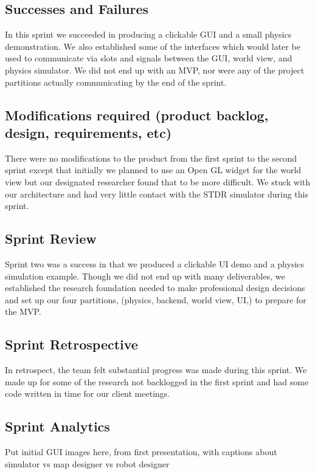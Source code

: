 \subsection{Successes and Failures}

In this sprint we succeeded in producing a clickable GUI and a small physics demonstration. We also established some of the interfaces which would later be used to communicate via slots and signals between the GUI, world view, and physics simulator. We did not end up with an MVP, nor were any of the project partitions actually communicating by the end of the sprint.

\subsection{Modifications required (product backlog, design, requirements, etc)}

There were no modifications to the product from the first sprint to the second sprint except that initially we planned to use an Open GL widget for the world view but our designated researcher found that to be more difficult. We stuck with our architecture and had very little contact with the STDR simulator during this sprint.

\subsection{Sprint Review}

Sprint two was a success in that we produced a clickable UI demo and a physics simulation example. Though we did not end up with many deliverables, we established the research foundation needed to make professional design decisions and set up our four partitions, (physics, backend, world view, UI,) to prepare for the MVP.

\subsection{Sprint Retrospective}

In retrospect, the team felt substantial progress was made during this sprint. We made up for some of the research not backlogged in the first sprint and had some code written in time for our client meetings.

\subsection{Sprint Analytics} 
Put initial GUI images here, from first presentation, with captions about simulator vs map designer vs robot designer


